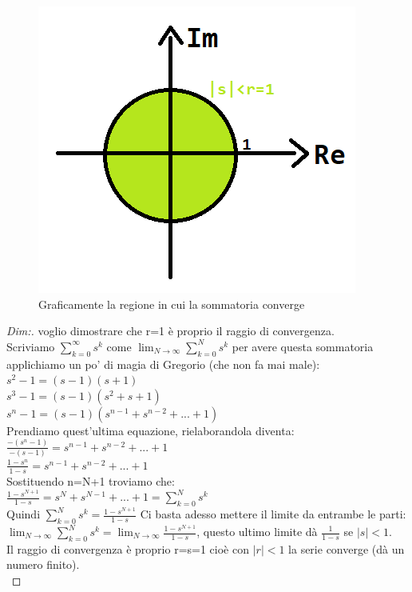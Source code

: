 \pagebreak

\begin{figure}[h]
	\centering
	\includegraphics[scale=0.5]{immagini/raggioDiConvergenza}
	\caption{ Graficamente la regione in cui la sommatoria converge }
	\label{fig: raggioDiConvergenza}
\end{figure}

\begin{proof}[Dim:] voglio dimostrare che r=1 è proprio il raggio di convergenza.\\
	Scriviamo $\sum_{k=0}^\infty s^{k} $ come $ \lim_{N \to \infty} \sum_{k=0}^N s^{k} $ per avere questa sommatoria applichiamo un po' di magia di Gregorio (che non fa mai male):\\
	
	$ s^2 -1 = (s-1)(s+1)$\\
	$ s^3 -1 = (s-1)(s^2+s+1 )$\\
	$ s^n -1 = (s-1)(s^{n-1}+ s^{n-2}+...+1)$\\
	Prendiamo quest'ultima equazione, rielaborandola diventa:\\
	$ \frac{ -(s^n -1) }{-(s-1) } = s^{n-1}+ s^{n-2}+...+1$\\
	$ \frac{ 1-s^n }{ 1-s } = s^{n-1}+ s^{n-2}+...+1$\\
	Sostituendo n=N+1 troviamo che:\\
	$ \frac{ 1-s^{N+1} }{ 1-s } = s^N+ s^{N-1}+...+1 = \sum_{k=0}^N s^{k}$\\
	Quindi $ \sum_{k=0}^N s^{k} = \frac{ 1-s^{N+1} }{ 1-s } $
	Ci basta adesso mettere il limite da entrambe le parti:\\
	 $\lim_{N \to \infty} \sum_{k=0}^N s^{k} = \lim_{N \to \infty} \frac{ 1-s^{N+1} }{ 1-s } $, questo ultimo limite dà $ \frac{1}{1-s} $ se $ |s|<1$.\\
	
	Il raggio di convergenza è proprio r=s=1 cioè con $ |r| < 1$ la serie converge (dà un numero finito).\\
	
\end{proof}

